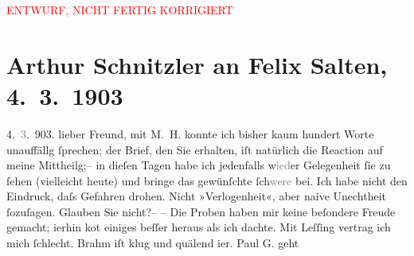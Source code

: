 
\begin{center}
            \textcolor{red}{ENTWURF, NICHT FERTIG KORRIGIERT}
                      \end{center}
            
         
         \renewcommand{\erwaehntePersonen}{Personen: Otto Brahm, Paul Goldmann, Mirjam Horwitz, Adolf Lantz, Emil Lessing, Felix Salten, Ottilie Salten, Olga Schnitzler, Julius Schnitzler, Curt Wigand}
         \renewcommand{\erwaehnteInstitutionen}{Institutionen: Die Zeit}
         \renewcommand{\erwaehnteOrte}{Orte: Berlin, Wien}
         \renewcommand{\erwaehnteWerke}{}
               \section[Arthur Schnitzler an Felix Salten, 4. 3. 1903]{ Arthur Schnitzler an Felix Salten, 4. 3. 1903}\nopagebreak{}\rehead{ }\begin{ledgroupsized}[t]{13cm}\normalsize\beginnumbering \toendnotes[C]{\smallbreak\pagebreak[2]} 
\toendnotes[C]{\smallbreak}\pstart
           \raggedleft{}{\pb}4. \textcolor{gray}{3}. 903. \pend
           \pstart
           lieber Freund, mit \textsc{M. H.} konnte ich bisher kaum hundert Worte unauffällg ſprechen; der Brief, den Sie
               erhalten, iſt natürlich die Reaction auf meine Mittheilg;– in dieſen Tagen habe ich
               jedenfalls w\textcolor{gray}{ied}er Gelegenheit ſie zu ſehen (vielleicht heute) und
               bringe das gewünſchte ſch\textcolor{gray}{were} bei. Ich habe nicht den Eindruck,
               daſs Gefahren drohen. Nicht »Verlogenheit«, aber naive Unechtheit ſozuſagen. Glauben
               Sie nicht?– {\pb}– Die Proben haben mir keine
               beſondere Freude gemacht; i{\geminationm}erhin ko{\geminationm}t einiges beſſer heraus als ich dachte. Mit Leſſing vertrag ich mich ſchlecht. Brahm iſt klug und quälend i{\geminationm}er. Paul G. geht

\end{ledgroupsized}
